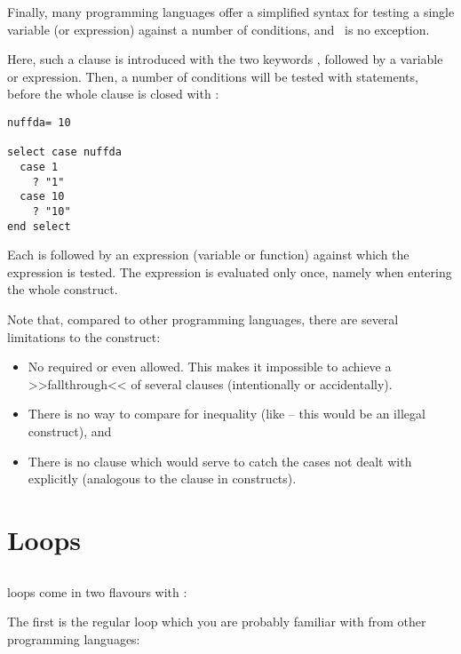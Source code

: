 Finally, many programming languages offer a simplified syntax for
testing a single variable (or expression) against a number of
conditions, and \SB\ is no exception.

Here, such a clause is introduced with the two keywords , followed by a variable or expression. Then, a number of
conditions will be tested with  statements, before the whole
clause is closed with :

\begin{lstlisting}
nuffda= 10

select case nuffda
  case 1
    ? "1"
  case 10
    ? "10"
end select
\end{lstlisting}

Each  is followed by an expression (variable or function)
against which the  expression is tested. The  expression is evaluated only once, namely when entering the whole
construct.

Note that, compared to other programming languages, there are several
limitations to the construct:

\begin{itemize}

\item No  required or even allowed. This makes it impossible
to achieve a >>fallthrough<< of several  clauses (intentionally
or accidentally).

\item There is no way to compare for inequality (like  --
this would be an illegal construct), and 

\item There is no  clause which would serve to catch the
cases not dealt with explicitly (analogous to the  clause in
 constructs).

\end{itemize}

\section{Loops}

\subsection{}

 loops come in two flavours with \SB:

The first is the regular loop which you are probably familiar with from
other programming languages:

